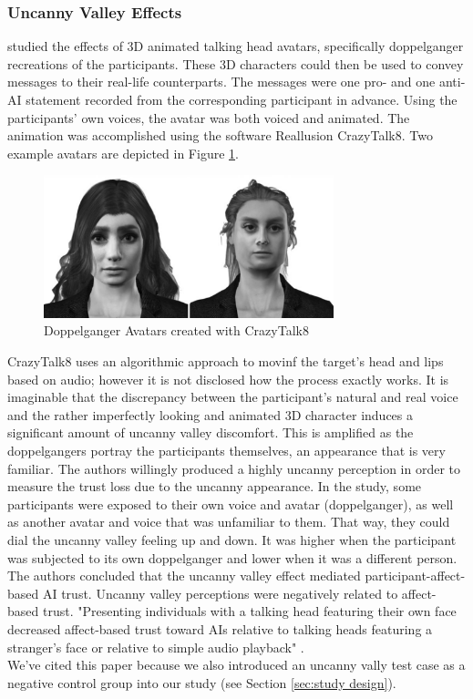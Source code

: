 \documentclass[
  a4paper,  %
  twoside,  %
  bibliography=totoc,
  headsepline,
  cleardoublepage=empty,
  parskip=half,
  draft=false
]{scrbook}
\begin{document}
\subsubsection*{Uncanny Valley Effects}
 studied the effects of 3D animated talking head avatars, specifically doppelganger recreations of the participants. These 3D characters could then be used to convey messages to their real-life counterparts. The messages were one pro- and one anti-AI statement recorded from the corresponding participant in advance. Using the participants' own voices, the avatar was both voiced and animated. The animation was accomplished using the software Reallusion CrazyTalk8. Two example avatars are depicted in Figure \ref{fig:uncanny-avatars}.

\begin{figure}[h]
  \centering
  \includegraphics[width=0.75\textwidth]{./graphics/uncanny-avatars.png}
  \caption{Doppelganger Avatars created with CrazyTalk8 \cite{weismanFaceUncannyEffects2021}}
  \label{fig:uncanny-avatars}
\end{figure}

CrazyTalk8 uses an algorithmic approach to movinf the target's head and lips based on audio; however it is not disclosed how the process exactly works. It is imaginable that the discrepancy between the participant's natural and real voice and the rather imperfectly looking and animated 3D character induces a significant amount of uncanny valley discomfort. This is amplified as the doppelgangers portray the participants themselves, an appearance that is very familiar. The authors willingly produced a highly uncanny perception in order to measure the trust loss due to the uncanny appearance. In the study, some participants were exposed to their own voice and avatar (doppelganger), as well as another avatar and voice that was unfamiliar to them. That way, they could dial the uncanny valley feeling up and down. It was higher when the participant was subjected to its own doppelganger and lower when it was a different person.\\
The authors concluded that the uncanny valley effect mediated participant-affect-based AI trust. Uncanny valley perceptions were negatively related to affect-based trust. "Presenting individuals with a talking head featuring their own face decreased affect-based trust toward AIs relative to talking heads featuring a stranger's face or relative to simple audio playback" \cite{weismanFaceUncannyEffects2021}. \\
We've cited this paper because we also introduced an uncanny vally test case as a negative control group into our study (see Section \ref{sec:study design}). 
\end{document}
